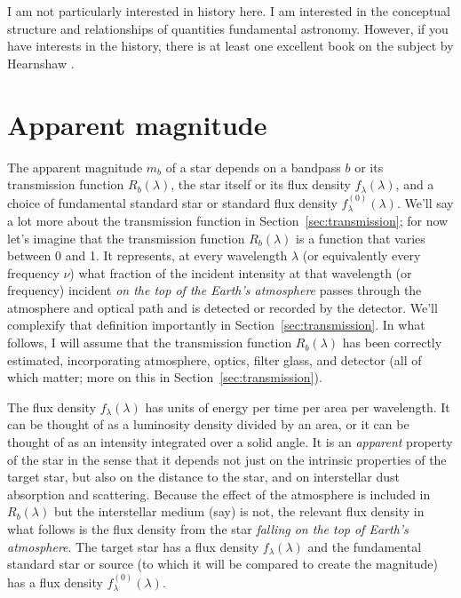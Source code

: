 \documentclass[10pt]{article}
\newcommand{\sectionname}{Section}
\newcommand{\secref}[1]{\sectionname~\ref{#1}}
\begin{document}
I am not particularly interested in history here.
I am interested in the conceptual structure and relationships of quantities fundamental astronomy.
However, if you have interests in the history, there is at least one excellent book on the subject by Hearnshaw \cite{hearnshaw}.

\section{Apparent magnitude}\label{sec:mag}

The apparent magnitude $m_b$ of a star depends on a bandpass $b$ or its transmission function $R_b(\lambda)$, the star itself or its flux density $f_\lambda(\lambda)$, and a choice of fundamental standard star or standard flux density $f^{(0)}_\lambda(\lambda)$.
We'll say a lot more about the transmission function in \secref{sec:transmission};
for now let's imagine that the transmission function $R_b(\lambda)$ is a function that varies between 0 and 1.
It represents, at every wavelength $\lambda$ (or equivalently every frequency $\nu$) what fraction of the incident intensity at that wavelength (or frequency) incident \emph{on the top of the Earth's atmosphere} passes through the atmosphere and optical path and is detected or recorded by the detector.
We'll complexify that definition importantly in \secref{sec:transmission}.
In what follows, I will assume that the transmission function $R_b(\lambda)$ has been correctly estimated, incorporating atmosphere, optics, filter glass, and detector (all of which matter; more on this in \secref{sec:transmission}).

The flux density $f_\lambda(\lambda)$ has units of energy per time per area per wavelength.
It can be thought of as a luminosity density divided by an area, or it can be thought of as an intensity integrated over a solid angle.
It is an \emph{apparent} property of the star in the sense that it depends not just on the intrinsic properties of the target star, but also on the distance to the star, and on interstellar dust absorption and scattering.
Because the effect of the atmosphere is included in $R_b(\lambda)$ but the interstellar medium (say) is not, the relevant flux density in what follows is the flux density from the star \emph{falling on the top of Earth's atmosphere}.
The target star has a flux density $f_\lambda(\lambda)$ and the fundamental standard star or source (to which it will be compared to create the magnitude) has a flux density $f^{(0)}_\lambda(\lambda)$.
\end{document}
